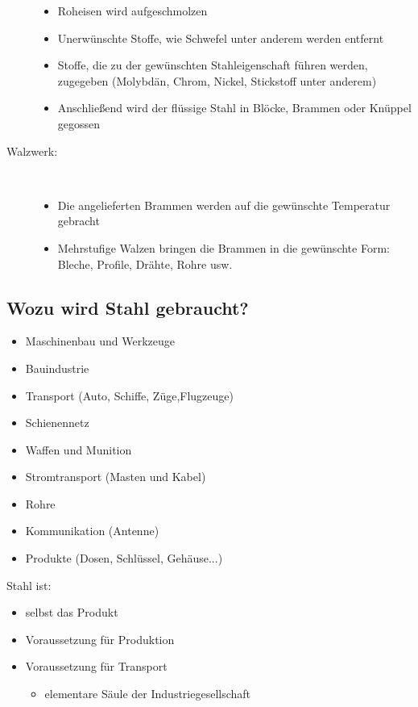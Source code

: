 \begin{description}
\begin{itemize}
		\item Roheisen wird aufgeschmolzen
		\item Unerwünschte Stoffe, wie Schwefel unter anderem werden entfernt
		\item Stoffe, die zu der gewünschten Stahleigenschaft führen werden,
			zugegeben (Molybdän, Chrom, Nickel, Stickstoff unter anderem)
		\item Anschließend wird der flüssige Stahl in Blöcke, Brammen oder Knüppel gegossen
	\end{itemize}
	\item[Walzwerk:]~
	\begin{itemize}
		\item Die angelieferten Brammen werden auf die gewünschte Temperatur gebracht
		\item Mehrstufige Walzen bringen die Brammen in die gewünschte Form: Bleche, Profile, Drähte, Rohre usw.
	\end{itemize}
\end{description}


\subsection{Wozu wird Stahl gebraucht?}
\begin{multicols}{2}
\begin{itemize}
	\item Maschinenbau und Werkzeuge
	\item Bauindustrie
	\item Transport (Auto, Schiffe, Züge,\newline Flugzeuge)
	\item Schienennetz
	\item Waffen und Munition
	\item Stromtransport (Masten und Kabel)
	\item Rohre
	\item Kommunikation (Antenne)
	\item Produkte (Dosen, Schlüssel, Gehäuse...)
\end{itemize}

Stahl ist:
\begin{itemize}
	\item selbst das Produkt
	\item Voraussetzung für Produktion
	\item Voraussetzung für Transport
	\begin{itemize}
		\item elementare Säule der Industriegesellschaft
	\end{itemize}
\end{itemize}
\end{multicols}

